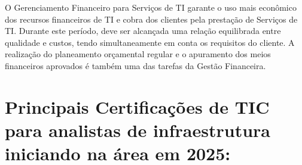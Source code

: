 \documentclass[
]{book}
\begin{document}
O Gerenciamento Financeiro para Serviços de TI garante o uso mais econômico dos recursos financeiros de TI e cobra dos clientes pela prestação de Serviços de TI. Durante este período, deve ser alcançada uma relação equilibrada entre qualidade e custos, tendo simultaneamente em conta os requisitos do cliente. A realização do planeamento orçamental regular e o apuramento dos meios financeiros aprovados é também uma das tarefas da Gestão Financeira.

\section{Principais Certificações de TIC para analistas de infraestrutura iniciando na área em 2025:}\label{principais-certificauxe7uxf5es-de-tic-para-analistas-de-infraestrutura-iniciando-na-uxe1rea-em-2025}
\end{document}
